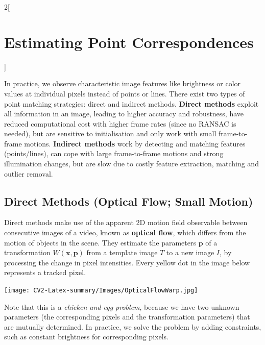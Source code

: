 \documentclass[oneside,fontsize=11pt,paper=a4]{scrartcl}
\begin{document}
\begin{multicols}{2}[\section{Estimating Point Correspondences}]

In practice, we observe characteristic image features like brightness or color values at individual pixels instead of points or lines. There exist two types of point matching strategies: direct and indirect methods. \textbf{Direct methods} exploit all information in an image, leading to higher accuracy and robustness, have reduced computational cost with higher frame rates (since no RANSAC is needed), but are sensitive to initialisation and only work with small frame-to-frame motions. \textbf{Indirect methods} work by detecting and matching features (points/lines), can cope with large frame-to-frame motions and strong illumination changes, but are slow due to costly feature extraction, matching and outlier removal.

\subsection{Direct Methods (Optical Flow; Small Motion)}
Direct methods make use of the apparent 2D motion field observable between consecutive images of a video, known as \textbf{optical flow}, which differs from the motion of objects in the scene. They estimate the parameters $\mathbf{p}$ of a transformation $W(\mathbf{x},\mathbf{p})$ from a template image $T$ to a new image $I$, by processing the change in pixel intensities. Every yellow dot in the image below represents a tracked pixel.

\begin{center}
    \texttt{[image: CV2-Latex-summary/Images/OpticalFlowWarp.jpg]}
\end{center}

Note that this is a \textit{chicken-and-egg problem}, because we have two unknown parameters (the corresponding pixels and the transformation parameters) that are mutually determined. In practice, we solve the problem by adding constraints, such as constant brightness for corresponding pixels.


\end{multicols}
\end{document}
